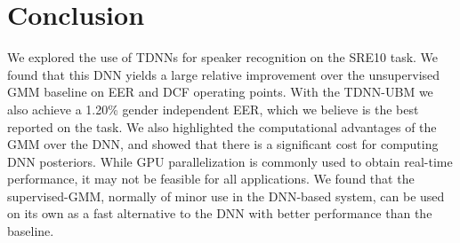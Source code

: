\documentclass{article}
\begin{document}
\section{Conclusion}

We explored the use of TDNNs for speaker recognition on the SRE10 task.
We found that this DNN yields a large relative improvement over the
unsupervised GMM baseline on EER and DCF operating points. With the
TDNN-UBM we also achieve a 1.20\% gender independent EER, 
which we believe is the best
reported on the task. We also highlighted the computational advantages
of the GMM over the DNN, and showed that there is a significant cost for
computing DNN posteriors. While GPU parallelization is commonly used to
obtain real-time performance, it may not be feasible for all applications.
We found that the supervised-GMM, normally
of minor use in the DNN-based system, can be 
used on its own as a fast alternative to the DNN with better performance
than the baseline. 



\end{document}
